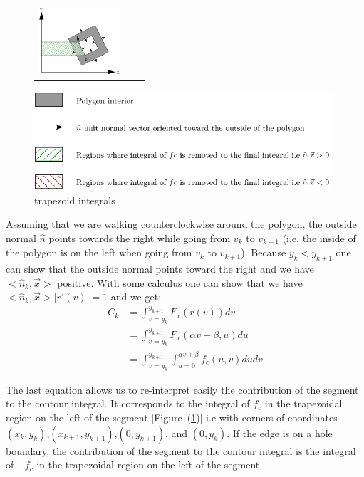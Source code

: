 \documentclass[11pt]{article}
\newcommand{\fig}[1]{[Figure~(#1)]}
\begin{document}
\begin{figure}[ht!]
\begin{center}
\begin{tabular}{ccc}
\includegraphics[height=2.5cm]{trapezoid_integrals_he.pdf}&
\end{tabular}
\includegraphics[width=11cm]{trapezoid_integrals_legend.pdf}
\caption[]{trapezoid integrals}
\label{fig:trapezoid_integrals}
\end{center}
\end{figure} 

Assuming that we are walking counterclockwise around the polygon, the outside normal $\hat{n}$ points towards the right while going from $v_k$ to $v_{k+1}$ (i.e. the inside of the polygon is on the left when going from $v_k$ to $v_{k+1}$). Because $y_k<y_{k+1}$ one can show that the outside normal points toward the right and  we have $<\hat{n}_k,\vec{x}>$ positive. With some calculus one can show that we have $<\hat{n}_k,\vec{x}>|r'(v)|=1$ and we get: 
\begin{equation} 
\begin{split}
C_k&=\int_{v=y_k}^{y_{k+1}} F_x(r(v))dv\\
&=\int_{v=y_{k}}^{y_{k+1}} F_x(\alpha v+\beta,u)du\\
&=\int_{v=y_{k}}^{y_{k+1}} \int_{u=0}^{\alpha v+\beta} f_c(u,v)du dv
\end{split}
\end{equation}

The last equation allows us to re-interpret easily the contribution of the segment to the contour integral. It corresponds to the integral of $f_c$ in the trapezoidal region on the left of the segment \fig{\ref{fig:trapezoid_integrals}} i.e with corners of coordinates $(x_{k},y_{k})$,$(x_{k+1},y_{k+1})$,$(0,y_{k+1})$, and $(0,y_{k})$. If the edge is on a hole boundary, the contribution of the segment to the contour integral is the integral of $-f_c$ in the trapezoidal region on the left of the segment.
\end{document}
